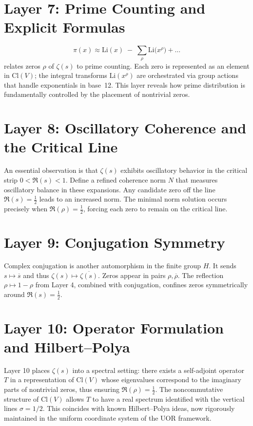\documentclass[11pt]{article}
\begin{document}
\section{Layer 7: Prime Counting and Explicit Formulas}
\[
  \pi(x)\approx \mathrm{Li}(x) \;-\;\sum_{\rho} \mathrm{Li}\bigl(x^\rho\bigr) + \dots 
\]
relates zeros $\rho$ of $\zeta(s)$ to prime counting. Each zero is represented as an element in $\mathrm{Cl}(V)$; the integral transforms \(\mathrm{Li}(x^\rho)\) are orchestrated via group actions that handle exponentials in base~12. This layer reveals how prime distribution is fundamentally controlled by the placement of nontrivial zeros.

\section{Layer 8: Oscillatory Coherence and the Critical Line}
\label{sec:oscillation-coherence}
An essential observation is that $\zeta(s)$ exhibits oscillatory behavior in the critical strip $0<\Re(s)<1$. Define a refined coherence norm $N$ that measures oscillatory balance in these expansions. Any candidate zero off the line $\Re(s)=\tfrac12$ leads to an increased norm. The minimal norm solution occurs precisely when $\Re(\rho)=\tfrac12$, forcing each zero to remain on the critical line.

\section{Layer 9: Conjugation Symmetry}
Complex conjugation is another automorphism in the finite group $H$. It sends $s\mapsto \overline{s}$ and thus $\zeta(s)\mapsto \overline{\zeta(s)}$. Zeros appear in pairs $\rho,\overline{\rho}$. The reflection $\rho\mapsto 1-\rho$ from Layer 4, combined with conjugation, confines zeros symmetrically around $\Re(s)=\tfrac12$. 

\section{Layer 10: Operator Formulation and Hilbert--Polya}
Layer 10 places $\zeta(s)$ into a spectral setting: there exists a self-adjoint operator $T$ in a representation of $\mathrm{Cl}(V)$ whose eigenvalues correspond to the imaginary parts of nontrivial zeros, thus ensuring $\Re(\rho)=\tfrac12$. The noncommutative structure of $\mathrm{Cl}(V)$ allows $T$ to have a real spectrum identified with the vertical lines $\sigma=1/2$. This coincides with known Hilbert--Polya ideas, now rigorously maintained in the uniform coordinate system of the UOR framework.
\end{document}
